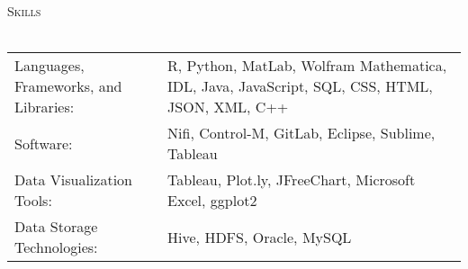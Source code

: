\documentclass[a4paper]{article}
\newcommand{\lineunder} {
    \vspace*{-8pt} \\
    \hspace*{-18pt} \hrulefill \\
}
\newcommand{\header} [1] {
    {\hspace*{-18pt}\vspace*{6pt} \textsc{#1}}
    \vspace*{-6pt} \lineunder
}
\begin{document}
\header{Skills}
\begin{tabular}{ l l }
	Languages, Frameworks, and Libraries: & R, Python, MatLab, Wolfram Mathematica, IDL, Java, JavaScript, SQL, CSS, HTML, JSON, XML, C++ \\
	Software:                             & Nifi, Control-M, GitLab, Eclipse, Sublime, Tableau                                            \\
	Data Visualization Tools:             & Tableau, Plot.ly, JFreeChart, Microsoft Excel, ggplot2                                        \\
	Data Storage Technologies:            & Hive, HDFS, Oracle, MySQL                                                                     \\
\end{tabular}
\vspace{2mm}





\ 
\end{document}
